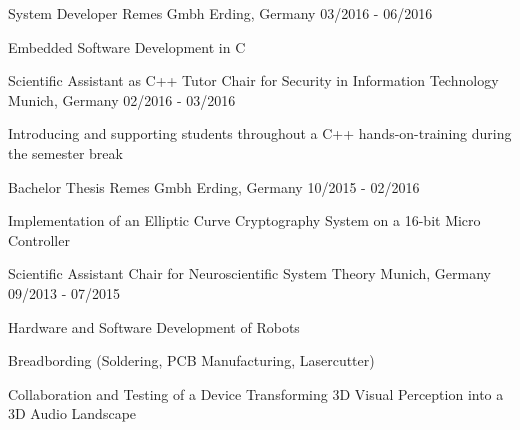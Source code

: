 \begin{cventries}
  \cventry
    {System Developer} %
    {Remes Gmbh} %
    {Erding, Germany} %
    {03/2016 - 06/2016} %
    {
      \begin{cvitems} %
        \item {Embedded Software Development in C}
      \end{cvitems}
    }

  \cventry
    {Scientific Assistant as C++ Tutor} %
    {Chair for Security in Information Technology} %
    {Munich, Germany} %
    {02/2016 - 03/2016} %
    {
      \begin{cvitems} %
        \item {Introducing and supporting students throughout a C++ hands-on-training during the semester break}
      \end{cvitems} 
    }

  \cventry
    {Bachelor Thesis} %
    {Remes Gmbh} %
    {Erding, Germany} %
    {10/2015 - 02/2016} %
    {
      \begin{cvitems} %
        \item {Implementation of an Elliptic Curve Cryptography System on a 16-bit Micro Controller}
      \end{cvitems}
    }

  \cventry
    {Scientific Assistant} %
    {Chair for Neuroscientific System Theory} %
    {Munich, Germany} %
    {09/2013 - 07/2015} %
    {
      \begin{cvitems} %
        \item {Hardware and Software Development of Robots}
        \item {Breadbording (Soldering, PCB Manufacturing, Lasercutter)}
        \item {Collaboration and Testing of a Device Transforming 3D Visual Perception into a 3D Audio Landscape}
      \end{cvitems}
    }


\end{cventries}
